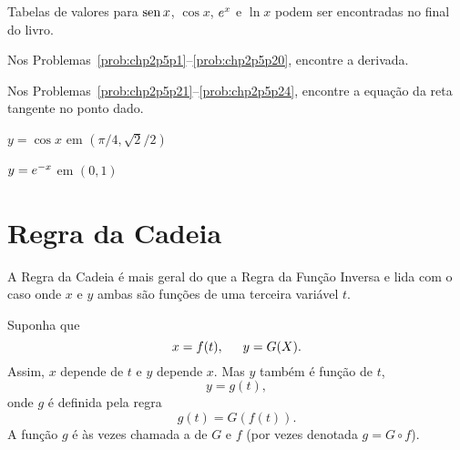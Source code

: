 Tabelas de valores para $\operatorname{sen} x$, $\cos x$, $e^x$ e $\ln x$ podem ser
encontradas no final do livro.

\begin{sectionproblems}
Nos Problemas~\ref{prob:chp2p5p1}--\ref{prob:chp2p5p20}, encontre a derivada.











Nos Problemas~\ref{prob:chp2p5p21}--\ref{prob:chp2p5p24}, encontre a
equação da reta tangente no ponto dado.

%
        {$y = \cos x$ \; em \; $(\pi/4, \sqrt{2}/2)$}

%
        {$y = e^{-x}$ \; em \; $(0, 1)$\label{prob:chp2p5p24}}

\end{sectionproblems}

\section{Regra da Cadeia}
\label{sec:chainrule}

A Regra da Cadeia é mais geral do que a Regra da Função Inversa e lida com
o caso onde $x$ e $y$ ambas são funções de uma terceira variável $t$.

Suponha que 
$$
  x = f(t),\hspace{1.5em} y = G(X).
$$
Assim, $x$ depende de $t$ e $y$ depende $x$. Mas $y$ também é função de $t$,
$$
  y = g(t),
$$
onde $g$ é definida pela regra
$$
  g(t) = G(f(t)).
$$
A função $g$ é às vezes chamada a 
de $G$ e $f$ (por vezes denotada $g = G \circ f$).

